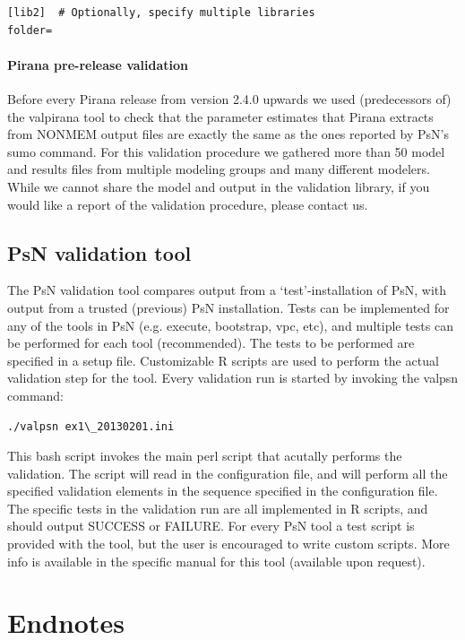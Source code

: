 {{{{\begin{lstlisting}
[lib2]  # Optionally, specify multiple libraries
folder=
\end{lstlisting}

\subsubsection*{Pirana pre-release validation}
Before every Pirana release from version 2.4.0 upwards we used
(predecessors of) the valpirana tool to check that the parameter
estimates that Pirana extracts from NONMEM output files are exactly
the same as the ones reported by PsN's sumo command. For this
validation procedure we gathered more than 50 model and results files
from multiple modeling groups and many different modelers. While we cannot share the 
model and output in the validation library, if you
would like a report of the validation procedure, please contact us.

\section{PsN validation tool}
The PsN validation tool compares output from a `test'-installation of
PsN, with output from a trusted (previous) PsN installation. Tests can
be implemented for any of the tools in PsN (e.g. execute, bootstrap,
vpc, etc), and multiple tests can be performed for each tool
(recommended). The tests to be performed are specified in a setup file. Customizable
R scripts are used to perform the actual validation step for the tool. Every validation run is started by invoking the valpsn command:

\begin{lstlisting}
./valpsn ex1\_20130201.ini
\end{lstlisting}

\noindent This bash script invokes the main perl script that acutally performs the
validation. The script will read in the configuration file, and will
perform all the specified validation elements in the sequence
specified in the configuration file. The specific tests in the
validation run are all implemented in R scripts, and should output
SUCCESS or FAILURE. For every PsN tool a test script is provided with
the tool, but the user is encouraged to write custom scripts. 
More info is available in the specific manual for this tool (available upon request).

\chapter{Endnotes}
}}}}
